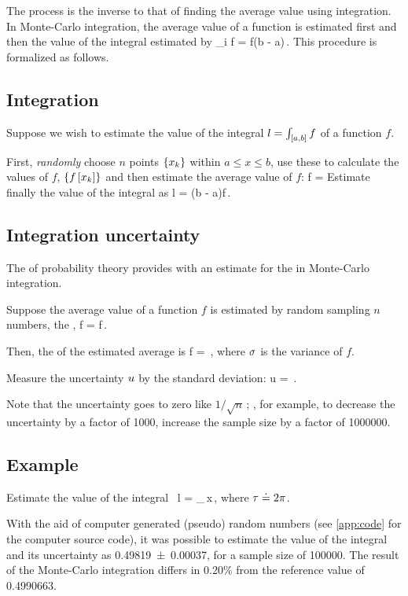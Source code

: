 The process is the inverse to that of finding the average value using integration. In Monte-Carlo integration, the average value of a function is estimated first and then the value of the integral estimated by
%
\beq
  \int_i f = \mean f\left(b - a\right)\,.
\eeq
%
This procedure is formalized as follows.


\subsection*{Integration}
%
Suppose we wish to estimate the value of the integral $l = \int_{\left[{a},{b}\right]} f$ of a function $f$.

First, \emph{randomly} choose $n$ points $\left\lbrace{x_k}\right\rbrace$ within $a\leq x\leq b$, use these to calculate the values of $f$, $\left\lbrace{f\left[{x_k}\right]}\right\rbrace$ and then estimate the average value of $f$:
%
\beq
  \mean f = 
\eeq
%
Estimate finally the value of the integral as
%
\beq
  l = \left(b - a\right)\mean f\,.
\eeq


\subsection*{Integration uncertainty}
%
The  of probability theory provides with an estimate for the  in Monte-Carlo integration. 

Suppose the average value of a function $f$ is estimated by random sampling $n$ numbers, \aka the ,
%
\beq
  \mean f =  f\,.
\eeq

Then, the  of the estimated average is
%
\beq
  \var\mean f = \,,
\eeq
%
where $\sigma$ is the variance of $f$.

Measure the uncertainty $u$ by the standard deviation:
%
\beq
  u = \,.
\eeq

Note that the uncertainty goes to zero like $1/\sqrt{n}$\,; \ie, for example, to decrease the uncertainty by a factor of \num{1000}, increase the sample size by a factor of \num{1000000}.


\subsection*{Example}
%
Estimate the value of the integral~
%
\beq
  l = \int_{}\exp{}\sin{}\,\dx x\,,
\eeq
%
where $\tau\doteq 2\pi$.

With the aid of computer generated (pseudo) random numbers (see \cref{app:code} for the computer source code), it was possible to estimate the value of the integral and its uncertainty as \num{0.49819 +- 0.00037}, for a sample size of \num{100000}. The result of the Monte-Carlo integration differs in 0.20\% from the reference value of \num{0.4990663}.

